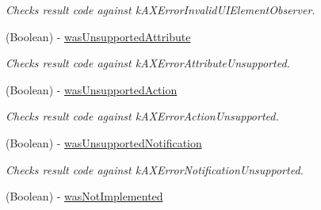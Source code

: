 \begin{DoxyCompactItemize}
\begin{DoxyCompactList}\small\item\em Checks result code against kAXErrorInvalidUIElementObserver. \item\end{DoxyCompactList}\item 
\hypertarget{interface_g_d_accessibility_operation_result_a00b526d6a9b0cfc3bce3dceac8b740aa}{
(Boolean) -\/ \hyperlink{interface_g_d_accessibility_operation_result_a00b526d6a9b0cfc3bce3dceac8b740aa}{wasUnsupportedAttribute}}
\label{interface_g_d_accessibility_operation_result_a00b526d6a9b0cfc3bce3dceac8b740aa}

\begin{DoxyCompactList}\small\item\em Checks result code against kAXErrorAttributeUnsupported. \item\end{DoxyCompactList}\item 
\hypertarget{interface_g_d_accessibility_operation_result_a32d16bf842d695e03a272a588ed42d9c}{
(Boolean) -\/ \hyperlink{interface_g_d_accessibility_operation_result_a32d16bf842d695e03a272a588ed42d9c}{wasUnsupportedAction}}
\label{interface_g_d_accessibility_operation_result_a32d16bf842d695e03a272a588ed42d9c}

\begin{DoxyCompactList}\small\item\em Checks result code against kAXErrorActionUnsupported. \item\end{DoxyCompactList}\item 
\hypertarget{interface_g_d_accessibility_operation_result_a17d8b08b85dc699fe149dc8e40ec3320}{
(Boolean) -\/ \hyperlink{interface_g_d_accessibility_operation_result_a17d8b08b85dc699fe149dc8e40ec3320}{wasUnsupportedNotification}}
\label{interface_g_d_accessibility_operation_result_a17d8b08b85dc699fe149dc8e40ec3320}

\begin{DoxyCompactList}\small\item\em Checks result code against kAXErrorNotificationUnsupported. \item\end{DoxyCompactList}\item 
\hypertarget{interface_g_d_accessibility_operation_result_ae382dcf5cc096516331e980fb73a8d9e}{
(Boolean) -\/ \hyperlink{interface_g_d_accessibility_operation_result_ae382dcf5cc096516331e980fb73a8d9e}{wasNotImplemented}}
\label{interface_g_d_accessibility_operation_result_ae382dcf5cc096516331e980fb73a8d9e}


\end{DoxyCompactItemize}
